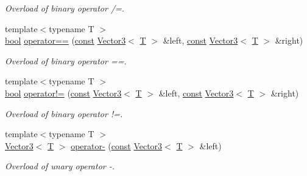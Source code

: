 \begin{DoxyCompactItemize}
\begin{DoxyCompactList}\small\item\em Overload of binary operator /=. \end{DoxyCompactList}\item 
{\footnotesize template$<$typename T $>$ }\\\hyperlink{term__entry_8h_a002004ba5d663f149f6c38064926abac}{bool} \hyperlink{classsf_1_1_vector3_a388d72db973306a35ba467016b3dee30}{operator==} (\hyperlink{term__entry_8h_a57bd63ce7f9a353488880e3de6692d5a}{const} \hyperlink{classsf_1_1_vector3}{Vector3}$<$ \hyperlink{curses_8priv_8h_a5ef253115820acf7d27f3c5c3b02a0f0}{T} $>$ \&left, \hyperlink{term__entry_8h_a57bd63ce7f9a353488880e3de6692d5a}{const} \hyperlink{classsf_1_1_vector3}{Vector3}$<$ \hyperlink{curses_8priv_8h_a5ef253115820acf7d27f3c5c3b02a0f0}{T} $>$ \&right)
\begin{DoxyCompactList}\small\item\em Overload of binary operator ==. \end{DoxyCompactList}\item 
{\footnotesize template$<$typename T $>$ }\\\hyperlink{term__entry_8h_a002004ba5d663f149f6c38064926abac}{bool} \hyperlink{classsf_1_1_vector3_a608500d1ad3b78082cb5bb4356742bd4}{operator!=} (\hyperlink{term__entry_8h_a57bd63ce7f9a353488880e3de6692d5a}{const} \hyperlink{classsf_1_1_vector3}{Vector3}$<$ \hyperlink{curses_8priv_8h_a5ef253115820acf7d27f3c5c3b02a0f0}{T} $>$ \&left, \hyperlink{term__entry_8h_a57bd63ce7f9a353488880e3de6692d5a}{const} \hyperlink{classsf_1_1_vector3}{Vector3}$<$ \hyperlink{curses_8priv_8h_a5ef253115820acf7d27f3c5c3b02a0f0}{T} $>$ \&right)
\begin{DoxyCompactList}\small\item\em Overload of binary operator !=. \end{DoxyCompactList}\item 
{\footnotesize template$<$typename T $>$ }\\\hyperlink{classsf_1_1_vector3}{Vector3}$<$ \hyperlink{curses_8priv_8h_a5ef253115820acf7d27f3c5c3b02a0f0}{T} $>$ \hyperlink{classsf_1_1_vector3_a9b75d2fb9b0f2fd9fe33f8f06f9dda75}{operator-\/} (\hyperlink{term__entry_8h_a57bd63ce7f9a353488880e3de6692d5a}{const} \hyperlink{classsf_1_1_vector3}{Vector3}$<$ \hyperlink{curses_8priv_8h_a5ef253115820acf7d27f3c5c3b02a0f0}{T} $>$ \&left)
\begin{DoxyCompactList}\small\item\em Overload of unary operator -\/. \end{DoxyCompactList}\item 

\end{DoxyCompactItemize}
